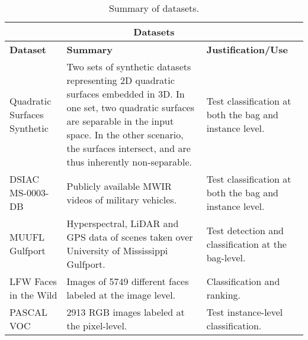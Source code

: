 \begin{longtable}{ |p{4cm}|p{6cm}|p{4cm}|  } 
	\caption{Summary of datasets.}
	\label{tab:Datasets}\\
	\hline
	\multicolumn{3}{|c|}{\textbf{Datasets}} \\
	\hline
	\textbf{Dataset} & \textbf{Summary} & \textbf{Justification/Use}\\
	\hline
	Quadratic Surfaces Synthetic   &  Two sets of synthetic datasets representing 2D quadratic surfaces embedded in 3D.  In one set, two quadratic surfaces are separable in the input space.  In the other scenario, the surfaces intersect, and are thus inherently non-separable.  & Test classification at both the bag and instance level.   \\
	\hline
	DSIAC MS-0003-DB   &  Publicly available MWIR videos of military vehicles. & Test classification at both the bag and instance level.   \\
	\hline
	MUUFL Gulfport &  Hyperspectral, LiDAR and GPS data of scenes taken over University of Mississippi Gulfport. & Test detection and classification at the bag-level.   \\
	\hline
	LFW Faces in the Wild & Images of 5749 different faces labeled at the  image level. & Classification and ranking. \\
	\hline
	PASCAL VOC  & 2913 RGB images labeled at the pixel-level. & Test instance-level classification. \\
	\hline
\end{longtable}